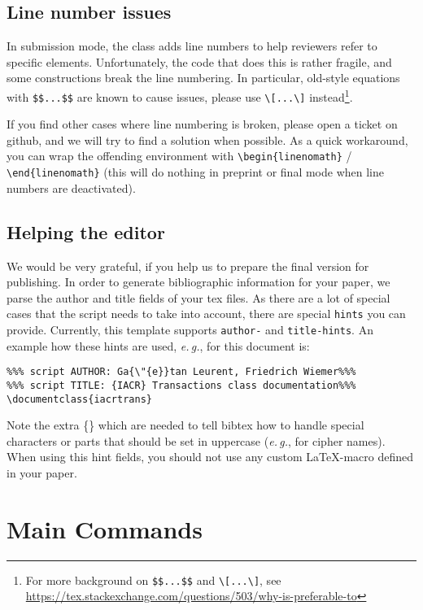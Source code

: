 \documentclass{iacrtrans}
\begin{document}
\subsection{Line number issues}

In submission mode, the class adds line numbers to help reviewers refer
to specific elements.  Unfortunately, the code that does this is rather
fragile, and some constructions break the line numbering.  In
particular, old-style equations with \verb+$$...$$+ are known to cause
issues, please use \verb+\[...\]+ instead\footnote{For more background
  on \texttt{\$\$...\$\$} and \texttt{\textbackslash[...\textbackslash]},
  see \url{https://tex.stackexchange.com/questions/503/why-is-preferable-to}}.

If you find other cases where line numbering is broken, please open a
ticket on github, and we will try to find a solution when possible.
As a quick workaround, you can wrap the offending environment with
\verb+\begin{linenomath}+ / \verb+\end{linenomath}+ (this will do
nothing in preprint or final mode when line numbers are deactivated).

\subsection{Helping the editor}

We would be very grateful, if you help us to prepare the final version for publishing.
In order to generate bibliographic information for your paper, we parse the author and title fields of your tex files.
As there are a lot of special cases that the script needs to take into account, there are special \texttt{hints} you can provide.
Currently, this template supports \texttt{author-} and \texttt{title-hints}.
An example how these hints are used, \emph{e.\,g.}, for this document is:
\begin{verbatim}
%%% script AUTHOR: Ga{\"{e}}tan Leurent, Friedrich Wiemer%%%
%%% script TITLE: {IACR} Transactions class documentation%%%
\documentclass{iacrtrans}
\end{verbatim}
Note the extra \{\} which are needed to tell bibtex how to handle special characters or parts that should be set in uppercase (\emph{e.\,g.}, for cipher names).
When using this hint fields, you should not use any custom \LaTeX-macro defined in your paper.

\section{Main Commands}
\end{document}
